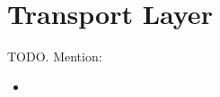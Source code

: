\section{Transport Layer} %
\label{sec:transport_layer}
TODO. Mention:
\begin{itemize}
	\item 
\end{itemize}
